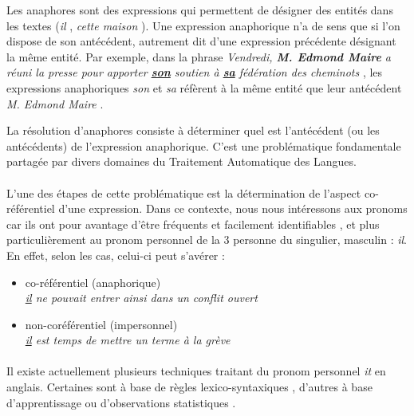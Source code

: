 \documentclass[a4paper,12pt]{article}
\begin{document}
Les anaphores sont des expressions qui permettent de désigner des entités dans les textes (\og \textit{il} \fg{}, \og \textit{cette maison} \fg{}). Une expression anaphorique n'a de sens que si l'on dispose de son antécédent, autrement dit d'une expression précédente désignant la même entité. Par exemple, dans la phrase \og \textit{Vendredi, \textbf{M. Edmond Maire} a réuni la presse pour apporter \underline{\textbf{son}} soutien à \underline{\textbf{sa}} fédération des cheminots} \fg{}, les expressions anaphoriques \og \textit{son} \fg{} et \og \textit{sa} \fg{} réfèrent à la même entité que leur antécédent \og \textit{M. Edmond Maire} \fg{}.

La résolution d'anaphores consiste à déterminer quel est l'antécédent (ou les antécédents) de l'expression anaphorique. C'est une problématique fondamentale partagée par divers domaines du Traitement Automatique des Langues.

\paragraph{}
L'une des étapes de cette problématique est la détermination de l'aspect co-référentiel d'une expression.
Dans ce contexte, nous nous intéressons aux pronoms car ils ont pour avantage d'être fréquents et facilement identifiables \citep{danlos-ilimp-taln2005}, et plus particulièrement au pronom personnel de la 3 personne du singulier, masculin : \og{}\textit{il}\fg{}. 
En effet, selon les cas, celui-ci peut s'avérer : 
\begin{itemize}
 \item co-référentiel (anaphorique)\\ \og{}\textit{\underline{il} ne pouvait entrer ainsi dans un conflit ouvert}\fg{}
 \item non-coréférentiel (impersonnel)\\ \og{}\textit{\underline{il} est temps de mettre un terme à la grève}\fg{}
\end{itemize}

\paragraph{}
Il existe actuellement plusieurs techniques traitant du pronom personnel \og{}\textit{it}\fg{} en anglais.
Certaines sont à base de règles lexico-syntaxiques \citep{Lappin-1994-APA-203987.203989}, d'autres à base d'apprentissage \citep{Li-2009-IPU-1622716.1622726} ou d'observations statistiques \citep{Bergsma-11}.
\end{document}
